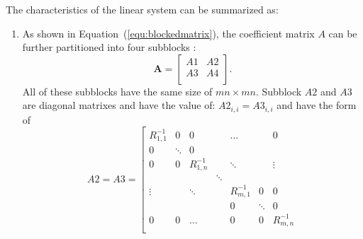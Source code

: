 The characteristics of the linear system can be summarized as:
\begin{enumerate}
  \item As shown in Equation~(\ref{equ:blockedmatrix}), the
      coefficient matrix $A$ can be further partitioned into four
      subblocks :
    \begin{equation}\label{equ:blockedmatrix}
        \mathbf{A} = \left[
        \begin{array}{cc}
            A1 & A2  \\
            A3 & A4  \\
        \end{array} \right].
    \end{equation}
All of these subblocks have the same size of $mn\times mn$. Subblock
$A2$ and $A3$ are diagonal matrixes and have the value of: $A2_{i,i} =
A3_{i,i}$ and have the form of
\begin{equation}\label{equ:A2A3}
        A2 = A3 = \left[
        \begin{array}{ccccccc}
            R_{1,1}^{-1}    & 0             & 0             & ~         & \ldots    & ~             & 0    \\
            0               & \ddots        & 0             & ~         & ~         & ~             & ~    \\
            0               & 0             & R_{1,n}^{-1}  & ~         & \ddots    & ~             & \vdots    \\
            ~               & ~             & ~             & \ddots    & ~         & ~             & ~    \\
            \vdots          & ~        & \ddots             & ~         & R_{m,1}^{-1}    & 0       & 0   \\
            ~               & ~             & ~             & ~         & 0         & \ddots        & 0    \\
            0               & 0             & \ldots              & ~         & 0    & 0             & R_{m,n}^{-1}    \\


\end{array}
\end{equation}
\end{enumerate}
